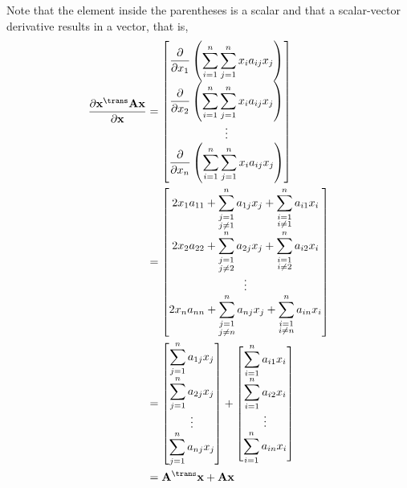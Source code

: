 Note that the element inside the parentheses is a scalar and that a scalar-vector derivative results in a vector, that is,
\begin{align}
    \dfrac{\partial \mathbf{x}^\trans \mathbf{A} \mathbf{x}}{\partial \mathbf{x}} &= \begin{bmatrix}
        \displaystyle \dfrac{\partial}{\partial x_1} \left( \sum_{i = 1}^{n}\sum_{j = 1}^{n} x_{i} a_{ij} x_{j} \right) \\ 
        \displaystyle  \dfrac{\partial}{\partial x_2} \left( \sum_{i = 1}^{n}\sum_{j = 1}^{n} x_{i} a_{ij} x_{j} \right) \\ 
        \vdots \\ 
        \displaystyle \dfrac{\partial}{\partial x_n} \left( \sum_{i = 1}^{n}\sum_{j = 1}^{n} x_{i} a_{ij} x_{j} \right) 
    \end{bmatrix} \\
    & = \begin{bmatrix}
        \displaystyle 2x_1a_{11} + \sum_{\substack{j = 1 \\ j \neq 1}}^{n} a_{1j} x_{j} + \sum_{\substack{i = 1 \\ i \neq 1}}^{n} a_{i1} x_{i} \\
        \displaystyle 2x_2a_{22} + \sum_{\substack{j = 1 \\ j \neq 2}}^{n} a_{2j} x_{j} + \sum_{\substack{i = 1 \\ i \neq 2}}^{n} a_{i2} x_{i} \\
        \vdots \\
        \displaystyle 2x_na_{nn} + \sum_{\substack{j = 1 \\ j \neq n}}^{n} a_{nj} x_{j} + \sum_{\substack{i = 1 \\ i \neq n}}^{n} a_{in} x_{i} 
    \end{bmatrix} \\
    &= \begin{bmatrix}
        \displaystyle \sum_{j = 1}^{n} a_{1j} x_{j} \\
        \displaystyle \sum_{j = 1}^{n} a_{2j} x_{j} \\
        \vdots \\
        \displaystyle \sum_{j = 1}^{n} a_{nj} x_{j} 
    \end{bmatrix} +
    \begin{bmatrix}
        \displaystyle \sum_{i = 1}^{n} a_{i1} x_{i} \\
        \displaystyle \sum_{i = 1}^{n} a_{i2} x_{i} \\
        \vdots \\
        \displaystyle \sum_{i = 1}^{n} a_{in} x_{i} 
    \end{bmatrix} \\
    & = \mathbf{A}^\trans \mathbf{x} + \mathbf{A} \mathbf{x}
\end{align}
